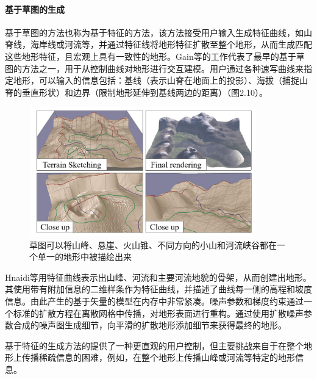 \paragraph{基于草图的生成}
基于草图的方法也称为基于特征的方法，该方法接受用户输入生成特征曲线，如山脊线，海岸线或河流等，并通过特征线将地形特征扩散至整个地形，从而生成匹配这些地形特征，且宏观上具有一致性的地形。Gain等\supercite{gain-sketching}的工作代表了最早的基于草图的方法之一，用于从控制曲线对地形进行交互建模。用户通过各种速写曲线来指定地形，可以输入的信息包括：基线（表示山脊在地面上的投影）、海拔（捕捉山脊的垂直形状）和边界（限制地形延伸到基线两边的距离）（图2.10）。\par
\begin{figure}[htbp]
\centering
\includegraphics[height=5.6cm,width=9.9cm]{figures/sketching.JPG}
\caption{草图可以将山峰、悬崖、火山锥、不同方向的小山和河流峡谷都在一个单一的地形中被描绘出来\supercite{gain-sketching}}
\end{figure}
Hnaidi等\supercite{HnaidiFeature}用特征曲线表示出山峰、河流和主要河流地貌的骨架，从而创建出地形。其使用带有附加信息的二维样条作为特征曲线，并描述了曲线每一侧的高程和坡度信息。由此产生的基于矢量的模型在内存中非常紧凑。噪声参数和梯度约束通过一个标准的扩散方程在离散网格中传播，对地形表面进行重构。通过使用扩散噪声参数合成的噪声图生成细节，向平滑的扩散地形添加细节来获得最终的地形。\par
基于特征的生成方法的提供了一种更直观的用户控制，但主要挑战来自于在整个地形上传播稀疏信息的困难，例如，在整个地形上传播山峰或河流等特定的地形信息。
